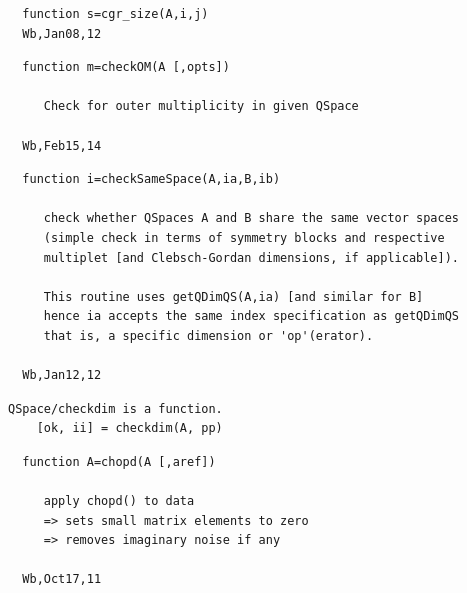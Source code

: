 \documentclass[twoside,12pt]{article}
\begin{document}
\pagebreak[3]



\begin{verbatim}
  function s=cgr_size(A,i,j)
  Wb,Jan08,12
\end{verbatim}

\pagebreak[3]



\begin{verbatim}
  function m=checkOM(A [,opts])
 
     Check for outer multiplicity in given QSpace
 
  Wb,Feb15,14
\end{verbatim}

\pagebreak[3]



\begin{verbatim}
  function i=checkSameSpace(A,ia,B,ib)
 
     check whether QSpaces A and B share the same vector spaces
     (simple check in terms of symmetry blocks and respective
     multiplet [and Clebsch-Gordan dimensions, if applicable]).
 
     This routine uses getQDimQS(A,ia) [and similar for B]
     hence ia accepts the same index specification as getQDimQS
     that is, a specific dimension or 'op'(erator).
 
  Wb,Jan12,12
\end{verbatim}

\pagebreak[3]



\begin{verbatim}
QSpace/checkdim is a function.
    [ok, ii] = checkdim(A, pp)
\end{verbatim}

\pagebreak[3]



\begin{verbatim}
  function A=chopd(A [,aref])
 
     apply chopd() to data
     => sets small matrix elements to zero
     => removes imaginary noise if any
 
  Wb,Oct17,11
\end{verbatim}

\pagebreak[3]


\end{document}
